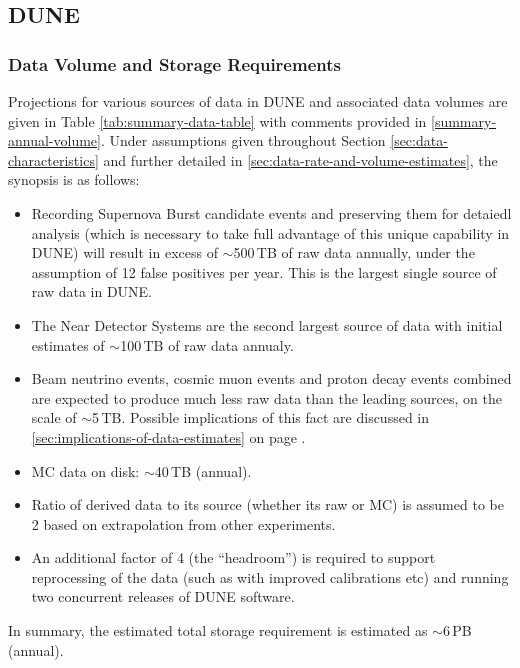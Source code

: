 \subsection{DUNE}
\subsubsection{Data Volume and Storage Requirements}
Projections for various sources of data in DUNE and associated data volumes are given in
Table \ref{tab:summary-data-table} with comments provided in \ref{summary-annual-volume}.
Under assumptions given throughout Section \ref{sec:data-characteristics} and further detailed
in \ref{sec:data-rate-and-volume-estimates}, the synopsis is as follows:
\begin{itemize}

\item Recording Supernova Burst candidate events and preserving them for detaiedl analysis (which is necessary to take
full advantage of this unique capability in DUNE) will result in excess of $\sim$500\,TB of raw data annually, under the assumption
of 12 false positives per year. This is the largest single source of raw data in DUNE.

\item The Near Detector Systems are the second largest source of data with initial estimates of $\sim$100\,TB of raw data annualy.

\item Beam neutrino events, cosmic muon events and proton decay events combined are expected to produce
much less raw data than the leading sources, on the scale of  $\sim$5\,TB. Possible implications of this fact
are discussed in \ref{sec:implications-of-data-estimates} on page \pageref{sec:implications-of-data-estimates}.

\item MC data on disk: $\sim$40\,TB (annual).

\item Ratio of derived data to its source (whether its raw or MC) is assumed to be 2 based on extrapolation from other experiments.

\item An additional factor of 4 (the ``headroom'') is required to support reprocessing of the data (such as with improved calibrations etc)
and running two concurrent releases of DUNE software.

\end{itemize}

In summary, the estimated total storage requirement is estimated as $\sim$6\,PB (annual).

